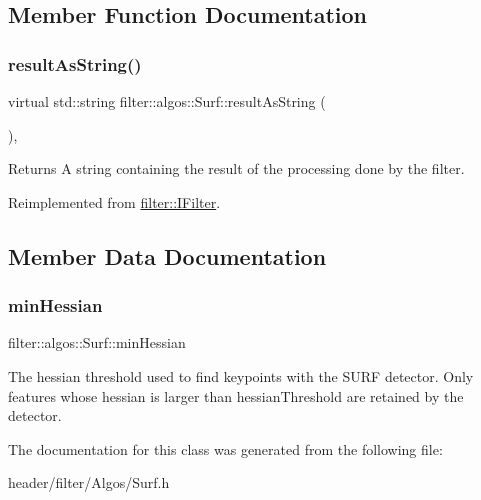 \subsection{Member Function Documentation}
\mbox{\label{classfilter_1_1algos_1_1_surf_ad7aae2eb2e5a5f2a0277eb5d58153833}} 
\subsubsection{\texorpdfstring{result\+As\+String()}{resultAsString()}}
{\footnotesize\ttfamily virtual std\+::string filter\+::algos\+::\+Surf\+::result\+As\+String (\begin{DoxyParamCaption}{ }\end{DoxyParamCaption})\hspace{0.3cm}{\ttfamily [inline]}, {\ttfamily [virtual]}}

\begin{DoxyReturn}{Returns}
A string containing the result of the processing done by the filter. 
\end{DoxyReturn}


Reimplemented from \hyperlink{classfilter_1_1_i_filter_ab99902b060a6d9edc3452a8c9f85e37e}{filter\+::\+I\+Filter}.



\subsection{Member Data Documentation}
\mbox{\label{classfilter_1_1algos_1_1_surf_a10c6204bfde9712b2a3b322dcd32d6c8}} 
\subsubsection{\texorpdfstring{min\+Hessian}{minHessian}}
{\footnotesize\ttfamily filter\+::algos\+::\+Surf\+::min\+Hessian}

The hessian threshold used to find keypoints with the S\+U\+RF detector. Only features whose hessian is larger than hessian\+Threshold are retained by the detector. 

The documentation for this class was generated from the following file\+:\begin{DoxyCompactItemize}
\item 
header/filter/\+Algos/Surf.\+h\end{DoxyCompactItemize}
